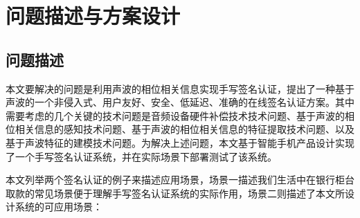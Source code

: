 \section{问题描述与方案设计}
\subsection{问题描述}
本文要解决的问题是利用声波的相位相关信息实现手写签名认证，提出了一种基于声波的一个非侵入式、用户友好、安全、低延迟、准确的在线签名认证方案。其中需要考虑的几个关键的技术问题是音频设备硬件补偿技术技术问题、基于声波的相位相关信息的感知技术问题、基于声波的相位相关信息的特征提取技术问题、以及基于声波特征的建模技术问题。为解决上述问题，本文基于智能手机产品设计实现了一个手写签名认证系统，并在实际场景下部署测试了该系统。

本文列举两个签名认证的例子来描述应用场景，场景一描述我们生活中在银行柜台取款的常见场景便于理解手写签名认证系统的实际作用，场景二则描述了本文所设计系统的可应用场景：
